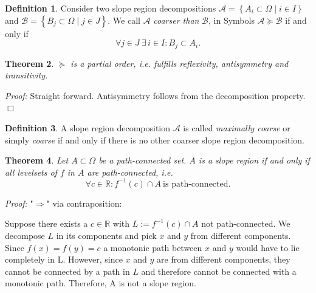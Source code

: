 \documentclass[a4paper,12pt,notitlepage,fullpage]{paper}
\theoremstyle{plain}
\newtheorem{thm}{Theorem}[section] %
\theoremstyle{definition}
\newtheorem{defn}[thm]{Definition} %
\begin{document}


\begin{defn}
Consider two slope region decompositions $\mathcal{A} = \left\{ A_i \subset \Omega \mid i \in I \right\}$ and $\mathcal{B} = \left\{ B_j \subset \Omega \mid j \in J \right\}$. We call $\mathcal{A}$ \emph{coarser than} $\mathcal{B}$, in Symbols $\mathcal{A} \succeq \mathcal{B}$ if and only if
\begin{equation*}
\forall j \in J ~ \exists \, i \in I: B_j \subset A_i.
\end{equation*}
\end{defn}

\begin{thm}
$\succeq$ is a partial order, i.e. fulfills reflexivity, antisymmetry and transitivity.
\end{thm}
\emph{Proof:} Straight forward. Antisymmetry follows from the decomposition property. \hfill $\Box$

\begin{defn}
A slope region decomposition $\mathcal{A}$ is called \emph{maximally coarse} or simply \emph{coarse} if and only if there is no other coarser slope region decomposition.
\end{defn}

\begin{thm}
\label{slope_iff_conn_lvlsets}
Let $A \subset \Omega$ be a path-connected set. $A$ is a slope region if and only if all levelsets of $f$ in $A$ are path-connected, i.e.
\begin{equation*}
\forall c \in \mathbb{R}: f^{-1}(c) \cap A ~ \text{is path-connected}.
\end{equation*}
\end{thm}

\emph{Proof:} "$\Rightarrow$" via contraposition:

Suppose there exists a $c \in \mathbb{R}$ with $L := f^{-1}(c) \cap A$ not path-connected. We decompose $L$ in its components and pick $x$ and $y$ from different components. Since $f(x) = f(y) = c$ a monotonic path between $x$ and $y$ would have to lie completely in L. However, since $x$ and $y$ are from different components, they cannot be connected by a path in $L$ and therefore cannot be connected with a monotonic path. Therefore, A is not a slope region.
\end{document}
